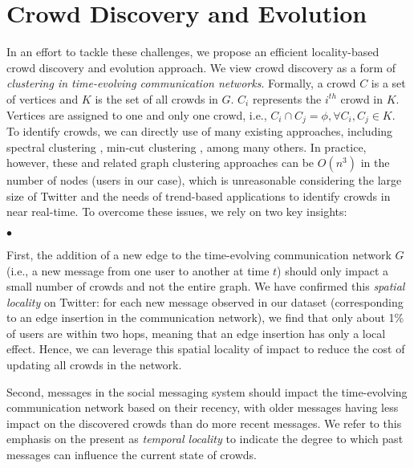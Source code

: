\documentclass{sig-alternate}
\newcommand{\squishlist}{
 \begin{list}{$\bullet$}
  { \setlength{\itemsep}{0pt}
     \setlength{\parsep}{3pt}
     \setlength{\topsep}{3pt}
     \setlength{\partopsep}{0pt}
     \setlength{\leftmargin}{1.5em}
     \setlength{\labelwidth}{1em}
     \setlength{\labelsep}{0.5em} } }
\newcommand{\squishend}{
  \end{list}  }
\begin{document}
\section{Crowd Discovery and Evolution}
\label{sec:crowd-discovery}
In an effort to tackle these challenges, we propose an efficient locality-based
crowd discovery and evolution approach. We view crowd discovery as a form of
\textit{clustering in time-evolving communication networks}. Formally, a crowd
$C$ is a set of vertices and $K$ is the set of all crowds in $G$. $C_i$
represents the $i^{th}$ crowd in $K$. Vertices are assigned to one and only one
crowd, i.e., $ C_i \cap C_j = \phi, \forall C_i, C_j \in K$. To identify crowds,
we can directly use of many existing approaches, including spectral clustering
\cite{dhillon:multilevel}, min-cut clustering \cite{flake:cut-clustering}, among
many others. In practice, however, these and related graph clustering approaches
can be $O(n^3)$ in the number of nodes (users in our case), which is unreasonable
considering the large size of Twitter and the needs of trend-based applications
to identify crowds in near real-time. To overcome these issues, we rely on two
key insights:

\squishlist

\item  First, the addition of a new edge to the time-evolving communication network $G$ (i.e., a new message from one user to another at time $t$) should only impact a small number of crowds and not the entire graph. We have confirmed this \textit{spatial locality} on Twitter: for each new message observed in our dataset (corresponding to an edge insertion in the communication network), we find that only about 1\% of users are within two hops, meaning that an edge insertion has only a local effect. Hence, we can leverage this spatial locality of impact to reduce the cost of updating all crowds in the network. 

\item Second, messages in the social messaging system should impact the time-evolving communication network based on their recency, with older messages having less impact on the discovered crowds than do more recent messages. We refer to this emphasis on the present as \textit{temporal locality} to indicate the degree to which past messages can influence the current state of crowds.

\squishend



\end{document}
